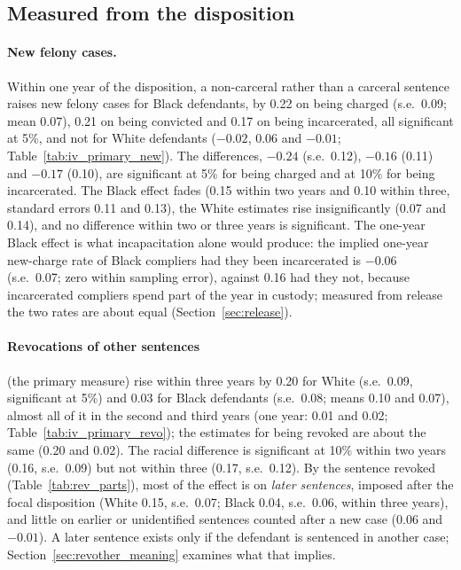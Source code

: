\documentclass[11pt]{article}
\begin{document}
\subsection{Measured from the disposition}\label{sec:disposition}

\paragraph{New felony cases.} Within one year of the disposition, a non-carceral rather than a carceral sentence raises new felony cases for Black defendants, by 0.22 on being charged (s.e.\ 0.09; mean 0.07), 0.21 on being convicted and 0.17 on being incarcerated, all significant at 5\%, and not for White defendants ($-0.02$, 0.06 and $-0.01$; Table~\ref{tab:iv_primary_new}). The differences, $-0.24$ (s.e.\ 0.12), $-0.16$ (0.11) and $-0.17$ (0.10), are significant at 5\% for being charged and at 10\% for being incarcerated. The Black effect fades (0.15 within two years and 0.10 within three, standard errors 0.11 and 0.13), the White estimates rise insignificantly (0.07 and 0.14), and no difference within two or three years is significant. The one-year Black effect is what incapacitation alone would produce: the implied one-year new-charge rate of Black compliers had they been incarcerated is $-0.06$ (s.e.\ 0.07; zero within sampling error), against 0.16 had they not, because incarcerated compliers spend part of the year in custody; measured from release the two rates are about equal (Section~\ref{sec:release}).

\paragraph{Revocations of other sentences} (the primary measure) rise within three years by 0.20 for White (s.e.\ 0.09, significant at 5\%) and 0.03 for Black defendants (s.e.\ 0.08; means 0.10 and 0.07), almost all of it in the second and third years (one year: 0.01 and 0.02; Table~\ref{tab:iv_primary_revo}); the estimates for being revoked are about the same (0.20 and 0.02). The racial difference is significant at 10\% within two years (0.16, s.e.\ 0.09) but not within three (0.17, s.e.\ 0.12). By the sentence revoked (Table~\ref{tab:rev_parts}), most of the effect is on \emph{later sentences}, imposed after the focal disposition (White 0.15, s.e.\ 0.07; Black 0.04, s.e.\ 0.06, within three years), and little on earlier or unidentified sentences counted after a new case (0.06 and $-0.01$). A later sentence exists only if the defendant is sentenced in another case; Section~\ref{sec:revother_meaning} examines what that implies.
\end{document}

